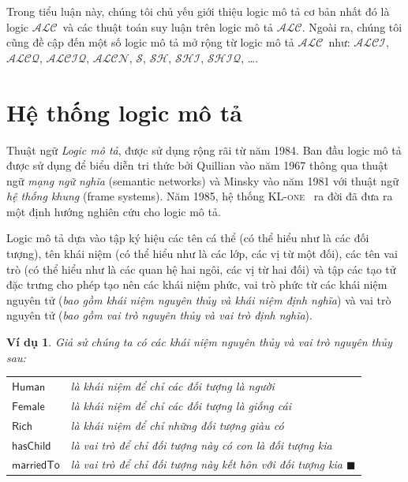 \documentclass[12pt,a4paper]{report}
\newtheorem{Example}{Ví dụ}[chapter]
\newcommand{\myend}{\mbox{}\hfill\mbox{{\scriptsize$\!\blacksquare$}}}
\newcommand{\ALC}{$\mathcal{ALC}$}
\newcommand{\ALCI}{$\mathcal{ALCI}$}
\newcommand{\ALCQ}{$\mathcal{ALCQ}$}
\newcommand{\ALCIQ}{$\mathcal{ALCIQ}$}
\newcommand{\ALCN}{$\mathcal{ALCN}$}
\newcommand{\LogicS}{$\mS$}
\newcommand{\SH}{$\mathcal{SH}$}
\newcommand{\SHI}{$\mathcal{SHI}$}
\newcommand{\SHIQ}{$\mathcal{SHIQ}$}
\newcommand{\mS}{\mathcal{S}}
\begin{document}
Trong tiểu luận này, chúng tôi chủ yếu giới thiệu logic mô tả cơ bản nhất đó là logic \ALC\ và các thuật toán suy luận trên logic mô tả \ALC. Ngoài ra, chúng tôi cũng đề cập đến một số logic mô tả mở rộng từ logic mô tả \ALC\ như: \ALCI, \ALCQ, \ALCIQ, \ALCN, \LogicS, \SH, \SHI, \SHIQ, \ldots.
 
\section{Hệ thống logic mô tả}\label{sec:DLSystems}
Thuật ngữ {\em Logic mô tả}, được sử dụng rộng rãi từ năm 1984. Ban đầu logic mô tả được sử dụng để biểu diễn tri thức bởi Quillian vào năm 1967 thông qua thuật ngữ \textit{mạng ngữ nghĩa} (semantic networks) và Minsky vào năm 1981 với thuật ngữ \textit{hệ thống khung} (frame systems). Năm 1985, hệ thống \textsc{KL-one}~\cite{ref:Brachman} ra đời đã đưa ra một định hướng nghiên cứu cho logic mô tả. 

Logic mô tả dựa vào tập ký hiệu các tên cá thể (có thể hiểu như là các đối tượng), tên khái niệm (có thể hiểu như là các lớp, các vị từ một đối), các tên vai trò (có thể hiểu như là các quan hệ hai ngôi, các vị từ hai đối) và tập các tạo tử đặc trưng cho phép tạo nên các khái niệm phức, vai trò phức từ các khái niệm nguyên tử (\textit{bao gồm khái niệm nguyên thủy và khái niệm định nghĩa}) và vai trò nguyên tử (\textit{bao gồm vai trò nguyên thủy và vai trò định nghĩa}).

\begin{Example}\label{ex:PrimitiveConcept}
Giả sử chúng ta có các khái niệm nguyên thủy và vai trò nguyên thủy sau:

  \begin{tabular}{l l}
   $\mathsf{Human}$ & là khái niệm để chỉ các đối tượng là người\\
   $\mathsf{Female}$ & là khái niệm để chỉ các đối tượng là giống cái\\
   $\mathsf{Rich}$ & là khái niệm để chỉ những đối tượng giàu có\\
   $\mathsf{hasChild}$ & là vai trò để chỉ đối tượng này có con là đối tượng kia\\
   $\mathsf{marriedTo}$ & là vai trò để chỉ đối tượng này kết hôn với đối tượng kia \hspace{10.5ex} \myend
  \end{tabular}
\end{Example}
\end{document}
